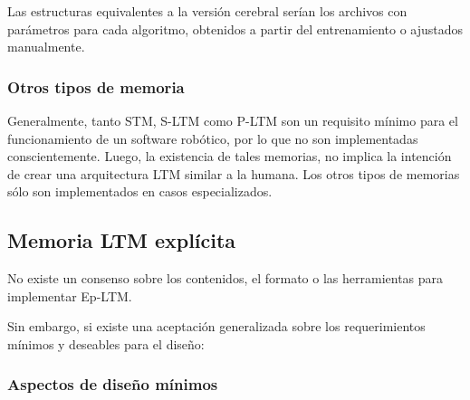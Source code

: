Las estructuras equivalentes a la versi\'on cerebral ser\'ian los archivos con par\'ametros para cada algoritmo, obtenidos a partir del entrenamiento o ajustados manualmente.


\subsubsection{Otros tipos de memoria}

Generalmente, tanto STM, S-LTM como P-LTM son un requisito m\'inimo para el funcionamiento de un software rob\'otico, por lo que no son implementadas conscientemente. Luego, la existencia de tales memorias, no implica la intenci\'on de crear una arquitectura LTM similar a la humana. Los otros tipos de memorias s\'olo son implementados en casos especializados.



\subsection{Memoria LTM expl\'icita}\label{sec:ltm_exp}


No existe un consenso sobre los contenidos, el formato o las herramientas para implementar Ep-LTM.


Sin embargo, si existe una aceptaci\'on generalizada sobre los requerimientos m\'inimos y deseables para el dise\~no\cite{Vijayakumar2014}\cite{Ho2009}\cite{Stachowicz2012}\cite{Jockel2008}:

\subsubsection{Aspectos de dise\~no m\'inimos}



